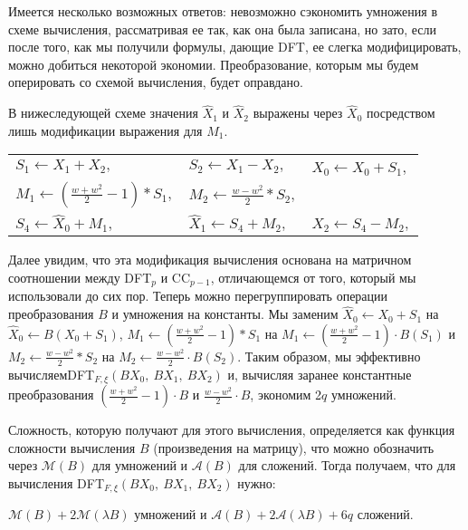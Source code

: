 \documentclass{mai_book}
\begin{document}
Имеется несколько возможных ответов: невозможно сэкономить умножения в схеме вычисления, рассматривая ее так, как она была записана, но зато, если после того, как мы получили формулы, дающие D{\footnotesize FT}, ее слегка модифицировать, можно добиться некоторой экономии. Преобразование, которым мы будем оперировать со схемой вычисления, будет оправдано.\par
В нижеследующей схеме значения $\hat{X}_1$ и $\hat{X}_2$ выражены через $\hat{X}_0$ посредством лишь модификации выражения для $M_1$.\par
\begin{center}
\begin{tabular}{|lll|}
  \hline
  $S_1 \leftarrow X_1+X_2,$ & $S_2 \leftarrow X_1-X_2,$ & $\hat{X}_0 \leftarrow X_0+S_1,$
  \\
  $M_1 \leftarrow ( \frac{w+w^2}{2} - 1) * S_1,$ & $M_2 \leftarrow \frac{w-w^2}{2} * S_2,$ & 
  \\
  $S_4 \leftarrow \hat{X}_0+M_1,$ & $\hat{X}_1 \leftarrow S_4+M_2,$ & $\hat{X}_2 \leftarrow S_4-M_2,$
  \\
  \hline
\end{tabular}
\end{center}
\par
Далее увидим, что эта модификация вычисления основана на матричном соотношении между D{\footnotesize FT}$_p$ и C{\footnotesize C}$_{p-1}$, отличающемся от того, который мы использовали до сих пор. Теперь можно перегруппировать операции преобразования $B$ и умножения на константы. Мы заменим $\hat{X}_0 \leftarrow X_0 + S_1$ на $\hat{X}_0 \leftarrow B(X_0 + S_1)$, $M_1 \leftarrow ( \frac{w+w^2}{2} - 1) * S_1$ на $M_1 \leftarrow ( \frac{w+w^2}{2} - 1) \cdot B(S_1)$ и $M_2 \leftarrow \frac{w-w^2}{2} * S_2$ на $M_2 \leftarrow \frac{w-w^2}{2} \cdot B(S_2)$. Таким образом, мы эффективно вычисляем\linebreak D{\footnotesize FT}$_{F, \xi}(BX_0,\ BX_1,\ BX_2)$ и, вычисляя заранее константные преобразования $( \frac{w+w^2}{2} - 1) \cdot B$ и $\frac{w-w^2}{2} \cdot B$, экономим 2$q$ умножений.\par
Сложность, которую получают для этого вычисления, определяется как функция сложности вычисления $B$ (произведения на матрицу), что можно обозначить через $\mathcal{M} (B)$ для умножений и $\mathcal{A} (B)$ для сложений. Тогда получаем, что для вычисления D{\footnotesize FT}$_{F, \xi}(BX_0,\ BX_1,\ BX_2)$ нужно:\par
\begin{center}
$\mathcal{M} (B) + 2 \mathcal{M} (\lambda B)$ умножений и $\mathcal{A} (B) + 2 \mathcal{A} (\lambda B) + 6q$ сложений.
\end{center}
\end{document}
